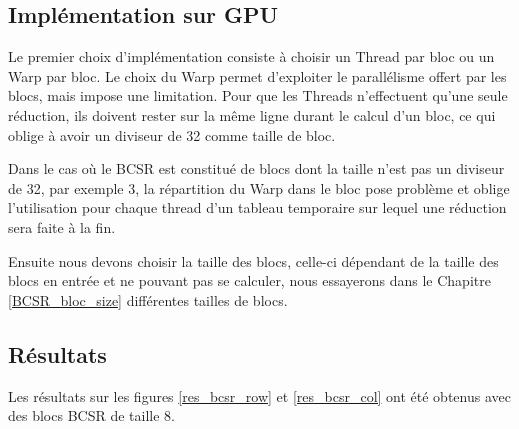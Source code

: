 \documentclass[a4paper,11pt]{report}
\begin{document}
  \subsection{Implémentation sur GPU}
   Le premier choix d'implémentation consiste à choisir un Thread par
   bloc ou un Warp par bloc. Le choix du Warp permet d'exploiter le
   parallélisme offert par les blocs, mais impose une limitation. Pour
   que les Threads n'effectuent qu'une seule réduction, ils doivent
   rester sur la même ligne durant le calcul d'un bloc, ce qui oblige
   à avoir un diviseur de 32 comme taille de bloc.
   

   Dans le cas où le BCSR est constitué de blocs dont la taille n'est
   pas un diviseur de 32, par exemple 3, la
   répartition du Warp dans le bloc pose problème et oblige
   l'utilisation pour chaque thread d'un tableau temporaire sur lequel
   une réduction sera faite à la fin.

   Ensuite nous devons choisir la taille des blocs, celle-ci dépendant
   de la taille des blocs en entrée et ne pouvant pas se calculer,
   nous essayerons dans le Chapitre \ref{BCSR_bloc_size} différentes
   tailles de blocs.
   
  \subsection{Résultats}
   Les résultats sur les figures \ref{res_bcsr_row} et \ref{res_bcsr_col} ont été obtenus avec des blocs BCSR de taille 8.
   
\end{document}
